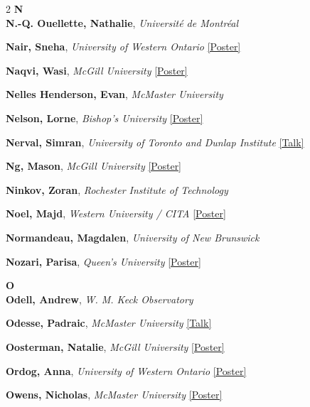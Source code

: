 \begin{small}
\begin{multicols}{2}
{\sffamily\bfseries\color{cascablue}\large N}\\[2pt]

\textbf{N.-Q. Ouellette, Nathalie}, {\footnotesize\textit{Université de Montréal}}\par
\textbf{Nair, Sneha}, {\footnotesize\textit{University of Western Ontario}} \hyperref[poster-abstract-page-talk-213]{\scriptsize\textcolor{cascateal}{[Poster]}}\par
\textbf{Naqvi, Wasi}, {\footnotesize\textit{McGill University}} \hyperref[poster-abstract-page-talk-95]{\scriptsize\textcolor{cascateal}{[Poster]}}\par
\textbf{Nelles Henderson, Evan}, {\footnotesize\textit{McMaster University}}\par
\textbf{Nelson, Lorne}, {\footnotesize\textit{Bishop's University}} \hyperref[poster-abstract-page-talk-166]{\scriptsize\textcolor{cascateal}{[Poster]}}\par
\textbf{Nerval, Simran}, {\footnotesize\textit{University of Toronto and Dunlap Institute}} \hyperref[abstract-page-talk-69]{\scriptsize\textcolor{cascablue}{[Talk]}}\par
\textbf{Ng, Mason}, {\footnotesize\textit{McGill University}} \hyperref[poster-abstract-page-talk-235]{\scriptsize\textcolor{cascateal}{[Poster]}}\par
\textbf{Ninkov, Zoran}, {\footnotesize\textit{Rochester Institute of Technology}}\par
\textbf{Noel, Majd}, {\footnotesize\textit{Western University / CITA}} \hyperref[poster-abstract-page-talk-114]{\scriptsize\textcolor{cascateal}{[Poster]}}\par
\textbf{Normandeau, Magdalen}, {\footnotesize\textit{University of New Brunswick}}\par
\textbf{Nozari, Parisa}, {\footnotesize\textit{Queen's University}} \hyperref[poster-abstract-page-talk-158]{\scriptsize\textcolor{cascateal}{[Poster]}}\par

{\sffamily\bfseries\color{cascablue}\large O}\\[2pt]

\textbf{Odell, Andrew}, {\footnotesize\textit{W. M. Keck Observatory}}\par
\textbf{Odesse, Padraic}, {\footnotesize\textit{McMaster University}} \hyperref[abstract-page-talk-187]{\scriptsize\textcolor{cascablue}{[Talk]}}\par
\textbf{Oosterman, Natalie}, {\footnotesize\textit{McGill University}} \hyperref[poster-abstract-page-talk-272]{\scriptsize\textcolor{cascateal}{[Poster]}}\par
\textbf{Ordog, Anna}, {\footnotesize\textit{University of Western Ontario}} \hyperref[poster-abstract-page-talk-266]{\scriptsize\textcolor{cascateal}{[Poster]}}\par
\textbf{Owens, Nicholas}, {\footnotesize\textit{McMaster University}} \hyperref[poster-abstract-page-talk-208]{\scriptsize\textcolor{cascateal}{[Poster]}}\par


\end{multicols}
\end{small}
